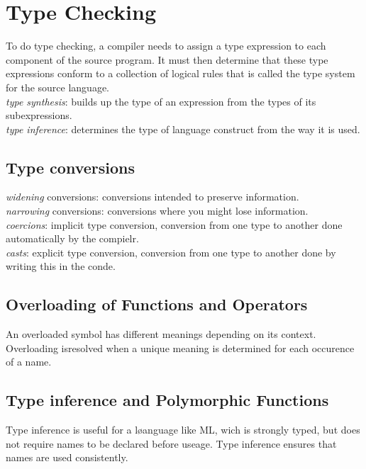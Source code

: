 \section{Type Checking}
To do type checking, a compiler needs to assign a type expression to each component of the source program. It must then determine that these type expressions conform to a collection of logical rules that is called the type system for the source language. \\
\emph{type synthesis}: builds up the type of an expression from the types of its subexpressions. \\
\emph{type inference}: determines the type of language construct from the way it is used. \\

\subsection{Type conversions}
\emph{widening} conversions: conversions intended to preserve information. \\
\emph{narrowing} conversions: conversions where you might lose information. \\

\emph{coercions}: implicit type conversion, conversion from one type to another done automatically by the compielr. \\
\emph{casts}: explicit type conversion, conversion from one type to another done by writing this in the conde. \\

\subsection{Overloading of Functions and Operators}
An overloaded symbol has different meanings depending on its context. Overloading isresolved when a unique meaning is determined for each occurence of a name.
\subsection{Type inference and Polymorphic Functions}
Type inference is useful for a løanguage like ML, wich is strongly typed, but does not require names to be declared before useage. Type inference ensures that names are used consistently.
